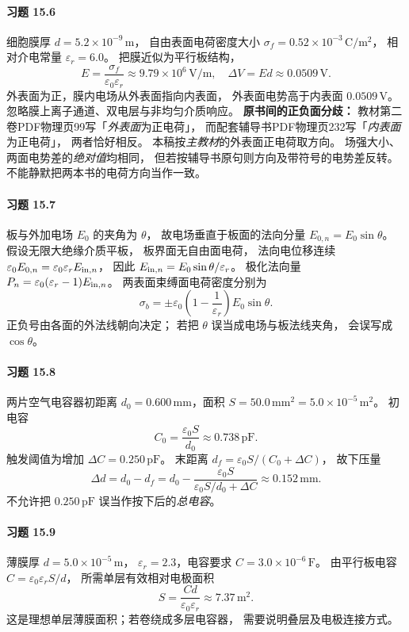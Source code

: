\paragraph{习题 15.6}
细胞膜厚
\(d=5.2\times10^{-9}\,\mathrm m\)，
自由表面电荷密度大小
\(\sigma_f=0.52\times10^{-3}\,\mathrm{C/m^2}\)，
相对介电常量 \(\varepsilon_r=6.0\)。
把膜近似为平行板结构，
\[
 \boxed{E=\frac{\sigma_f}
 {\varepsilon_0\varepsilon_r}
 \approx9.79\times10^6\,\mathrm{V/m}},
\quad
 \boxed{\Delta V=Ed\approx0.0509\,\mathrm V}.
\]
外表面为正，膜内电场从外表面指向内表面，
外表面电势高于内表面 \(0.0509\,\mathrm V\)。
忽略膜上离子通道、双电层与非均匀介质响应。
\textbf{原书间的正负面分歧：}
教材第二卷PDF物理页99写「\emph{外表面}为正电荷」，
而配套辅导书PDF物理页232写「\emph{内表面}为正电荷」，
两者恰好相反。
本稿按\emph{主教材}的外表面正电荷取方向。
场强大小、两面电势差的\emph{绝对值}均相同，
但若按辅导书原句则方向及带符号的电势差反转。
不能静默把两本书的电荷方向当作一致。

\paragraph{习题 15.7}
板与外加电场 \(E_0\) 的夹角为 \(\theta\)，
故电场垂直于板面的法向分量
\(E_{0,n}=E_0\sin\theta\)。
假设无限大绝缘介质平板，
板界面无自由面电荷，
法向电位移连续
\(\varepsilon_0E_{0,n}
 =\varepsilon_0\varepsilon_r E_{{\rm in},n}\)，
因此
\(E_{{\rm in},n}=E_0\sin\theta/\varepsilon_r\)。
极化法向量
\(P_n=\varepsilon_0(\varepsilon_r-1)E_{{\rm in},n}\)。
两表面束缚面电荷密度分别为
\[
 \boxed{\sigma_b=\pm\varepsilon_0
 \left(1-\frac1{\varepsilon_r}\right)
 E_0\sin\theta}.
\]
正负号由各面的外法线朝向决定；
若把 \(\theta\) 误当成电场与板法线夹角，
会误写成 \(\cos\theta\)。

\paragraph{习题 15.8}
两片空气电容器初距离
\(d_0=0.600\,\mathrm{mm}\)，面积
\(S=50.0\,\mathrm{mm^2}=5.0\times10^{-5}\,\mathrm{m^2}\)。
初电容
\[
 C_0=\frac{\varepsilon_0S}{d_0}
 \approx0.738\,\mathrm{pF}.
\]
触发阈值为增加
\(\Delta C=0.250\,\mathrm{pF}\)。
末距离
\(d_f=\varepsilon_0S/(C_0+\Delta C)\)，
故下压量
\[
 \boxed{\Delta d=d_0-d_f
 =d_0-\frac{\varepsilon_0S}
 {\varepsilon_0S/d_0+\Delta C}
 \approx0.152\,\mathrm{mm}}.
\]
不允许把 \(0.250\,\mathrm{pF}\)
误当作按下后的\emph{总电容}。

\paragraph{习题 15.9}
薄膜厚
\(d=5.0\times10^{-5}\,\mathrm m\)，
\(\varepsilon_r=2.3\)，电容要求
\(C=3.0\times10^{-6}\,\mathrm F\)。
由平行板电容
\(C=\varepsilon_0\varepsilon_rS/d\)，
所需单层有效相对电极面积
\[
 \boxed{S=\frac{Cd}{\varepsilon_0\varepsilon_r}
 \approx7.37\,\mathrm{m^2}}.
\]
这是理想单层薄膜面积；若卷绕成多层电容器，
需要说明叠层及电极连接方式。

